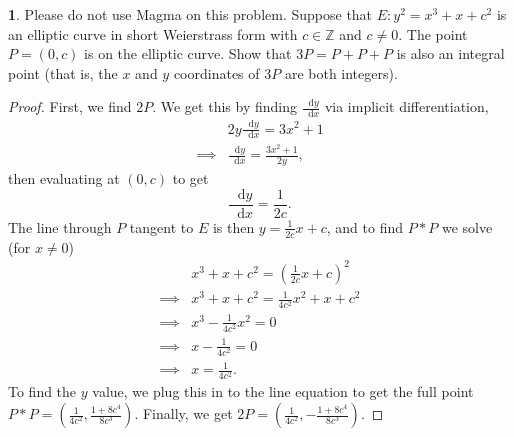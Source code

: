 \documentclass[12pt]{article}
\newcommand{\dd}{\mathop{}\!\mathrm{d}}
\theoremstyle{definition}
\newtheorem{ex}{}
\begin{document}
\begin{ex}
	Please do not use Magma on this problem.
	Suppose that $E : y^{2} = x^{3} + x + c^{2}$ is an elliptic curve in short Weierstrass form
	with $c \in \mathbb{Z}$ and $c \ne 0$. The point $P = (0,c)$ is on the elliptic curve. Show that $3P = P + P + P$ is also an integral point (that is, the $x$ and $y$ coordinates of $3P$ are both integers).
\end{ex}
\begin{proof}
	First, we find $2P$.
	We get this by finding $\frac{\dd y}{\dd x}$ via implicit differentiation, \begin{align*}
		         & 2y \frac{\dd y}{\dd x} = 3x^2 + 1          \\
		\implies & \frac{\dd y}{\dd x} = \frac{3x^2 + 1}{2y},
	\end{align*}
	then evaluating at $(0, c)$ to get \begin{equation*}
		\frac{\dd y}{\dd x} = \frac{1}{2c}.
	\end{equation*}
	The line through $P$ tangent to $E$ is then $y = \frac{1}{2c}x + c$, and to find $P * P$ we solve (for $x \neq 0$) \begin{align*}
		         & x^3 + x + c^2 = (\frac{1}{2c}x + c)^2       \\
		\implies & x^3 + x + c^2 = \frac{1}{4c^2}x^2 + x + c^2 \\
		\implies & x^3 - \frac{1}{4c^2}x^2 = 0                 \\
		\implies & x - \frac{1}{4c^2} = 0                      \\
		\implies & x = \frac{1}{4c^2}.
	\end{align*}
	To find the $y$ value, we plug this in to the line equation to get the full point $P * P = (\frac{1}{4c^2}, \frac{1 + 8c^4}{8c^3})$.
	Finally, we get $2P = (\frac{1}{4c^2}, -\frac{1 + 8c^4}{8c^3})$.


\end{proof}
\end{document}
